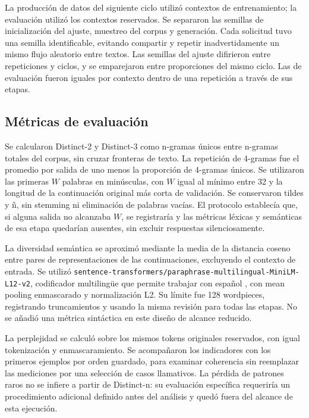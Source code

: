 \documentclass[12pt,letterpaper]{article}
\begin{document}
La producción de datos del siguiente ciclo utilizó contextos de
entrenamiento; la evaluación utilizó los contextos reservados. Se
separaron las semillas de inicialización del ajuste, muestreo del corpus
y generación. Cada solicitud tuvo una semilla identificable, evitando
compartir y repetir inadvertidamente un mismo flujo aleatorio entre textos.
Las semillas del ajuste difirieron entre repeticiones y ciclos, y se
emparejaron entre proporciones del mismo ciclo. Las de evaluación fueron
iguales por contexto dentro de una repetición a través de sus etapas.

\subsection{Métricas de evaluación}

Se calcularon Distinct-2 y Distinct-3 como n-gramas únicos entre n-gramas
totales del corpus, sin cruzar fronteras de texto. La repetición de
4-gramas fue el promedio por salida de uno menos la proporción de
4-gramas únicos. Se utilizaron las primeras \(W\) palabras en minúsculas,
con \(W\) igual al mínimo entre 32 y la longitud de la continuación
original más corta de validación. Se conservaron tildes y ñ, sin stemming
ni eliminación de palabras vacías. El protocolo
establecía que, si alguna salida no alcanzaba \(W\), se registraría y
las métricas léxicas y semánticas de esa etapa quedarían ausentes, sin
excluir respuestas silenciosamente.

La diversidad semántica se aproximó mediante la media de la distancia
coseno entre pares de representaciones de las continuaciones, excluyendo
el contexto de entrada. Se utilizó
\texttt{sentence-transformers/paraphrase-multilingual-MiniLM-L12-v2},
codificador multilingüe que permite trabajar con español
\cite{multilingualcard}, con mean pooling enmascarado y normalización L2.
Su límite fue 128 wordpieces, registrando truncamientos y usando la misma
revisión para todas las etapas. No se añadió una métrica sintáctica en
este diseño de alcance reducido.

La perplejidad se calculó sobre los mismos tokens originales reservados,
con igual tokenización y enmascaramiento. Se acompañaron los indicadores
con los primeros ejemplos por orden guardado, para examinar coherencia
sin reemplazar las mediciones por una selección de casos llamativos.
La pérdida de patrones raros no se infiere a partir de Distinct-n: su
evaluación específica requeriría un procedimiento adicional definido antes
del análisis y quedó fuera del alcance de esta ejecución.
\end{document}
